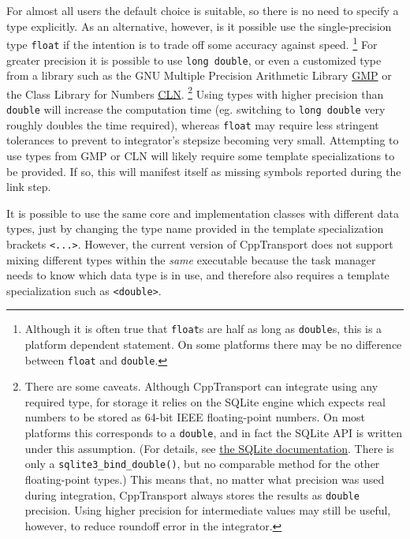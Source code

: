 \documentclass[11pt,a4paper]{article}
\newcounter{advancedbox}[section]
\newenvironment{advanced}[1]{\stepcounter{advancedbox}\begin{tcolorbox}[enhanced,breakable,colback=red!10,colbacktitle=red!20,colframe=red!40,coltitle=black,title={Advanced usage: {#1}},fonttitle=\sffamily\fontseries{b}\selectfont]}{\end{tcolorbox}}
\newcommand{\packagefont}{\sffamily}
\newcommand{\CppTransport}{{\packagefont CppTransport}}
\newcommand{\SQLite}{{\packagefont SQLite}}
\begin{document}
\begin{advanced}{Custom integration data types}
    For almost all users the default choice is suitable,
    so there is no need to specify a type explicitly.
    As an alternative, however, is it possible use the single-precision type
    \texttt{float}
    if the intention is to trade off some accuracy against speed.%
        \footnote{Although it is often true that
        \texttt{float}s are half as long as
        \texttt{double}s, this is a platform dependent statement.
        On some platforms there may be no difference between
        \texttt{float} and \texttt{double}.}
    For greater precision it is possible to use
    \texttt{long double},
    or even a customized type
    from a library such as the GNU Multiple Precision Arithmetic Library
    \href{https://gmplib.org}{GMP}
    or the Class Library for Numbers \href{http://www.ginac.de/CLN}{CLN}.%
        \footnote{There are some caveats. Although {\CppTransport} can integrate
        using any required type, for storage it relies on the
        {\SQLite} engine which expects real numbers to be stored as
        64-bit IEEE floating-point numbers.
        On most platforms this corresponds to a \texttt{double},
        and in fact the {\SQLite} API
        is written under this assumption.
        (For details, see
        \href{https://www.sqlite.org/c3ref/bind_blob.html}{the {\SQLite}
        documentation}.
        There is only a
        \texttt{sqlite3_bind_double()}, but no
        comparable method for the other floating-point types.)
        This means that, no matter what precision was used during integration,
        {\CppTransport} always stores the results
        as \texttt{double} precision.
        Using higher precision for intermediate values may still be useful,
        however, to reduce roundoff error in the integrator.}
    Using types with higher precision than \texttt{double} will
    increase the computation time
    (eg. switching to \texttt{long double}
    very roughly doubles the time required),
    whereas
    \texttt{float} may require less stringent tolerances
    to prevent to integrator's stepsize becoming very small.
    Attempting to use types from GMP or CLN will likely require some
    template specializations to be provided. If so, this will manifest itself
    as missing symbols reported during the link step.
    
    It is possible to use the same core and implementation classes with
    different data types, just by changing the type name provided
    in the template specialization brackets
    \texttt{<...>}.
    However, the current version of {\CppTransport} does not support mixing different
    types within the \emph{same} executable because the task manager
    needs to know which data type is in use, and therefore also requires
    a template specialization such as
    \texttt{<double>}.
\end{advanced}
\end{document}
